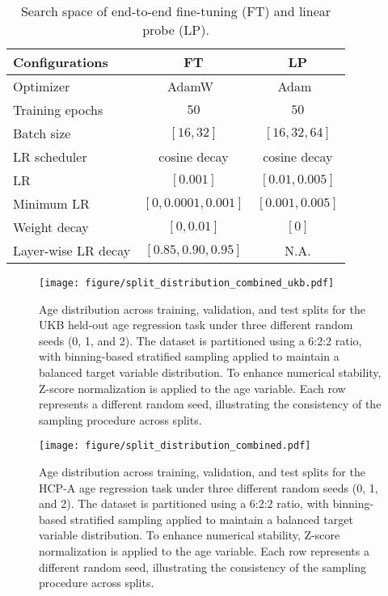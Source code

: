 \begin{table}[ht]
    \centering
    \caption{Search space of end-to-end fine-tuning (FT) and linear probe (LP).}\label{tab:hyperparam_grid}
    \begin{tabular}{lcc}
        \toprule
        \textbf{Configurations} & \textbf{FT} & \textbf{LP} \\
        \midrule
        Optimizer & AdamW~\citep{loshchilov2017decoupled} & Adam~\citep{diederik2014adam} \\
        Training epochs & $50$ & $50$ \\
        Batch size & $[16, 32]$ & $[16, 32, 64]$ \\
        LR scheduler & cosine decay & cosine decay \\
        LR & $[0.001]$ & $[0.01, 0.005]$ \\
        Minimum LR & $[0, 0.0001, 0.001]$ & $[0.001, 0.005]$ \\
        Weight decay & $[0, 0.01]$ & $[0]$ \\
        Layer-wise LR decay & $[0.85, 0.90, 0.95]$ & N.A. \\
        \bottomrule
    \end{tabular}
\end{table}


\begin{figure*}[ht]
\centering
\texttt{[image: figure/split\_distribution\_combined\_ukb.pdf]}
\caption{Age distribution across training, validation, and test splits for the UKB held-out age regression task under three different random seeds (0, 1, and 2). The dataset is partitioned using a 6:2:2 ratio, with binning-based stratified sampling applied to maintain a balanced target variable distribution. To enhance numerical stability, Z-score normalization is applied to the age variable. Each row represents a different random seed, illustrating the consistency of the sampling procedure across splits.}\label{fig:split_distribution_ukb}
\end{figure*}

\newpage
\begin{figure*}[ht]
\centering
\texttt{[image: figure/split\_distribution\_combined.pdf]}
\caption{Age distribution across training, validation, and test splits for the HCP-A age regression task under three different random seeds (0, 1, and 2). The dataset is partitioned using a 6:2:2 ratio, with binning-based stratified sampling applied to maintain a balanced target variable distribution. To enhance numerical stability, Z-score normalization is applied to the age variable. Each row represents a different random seed, illustrating the consistency of the sampling procedure across splits.}\label{fig:split_distribution_hcp}
\end{figure*}

